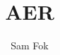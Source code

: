 \documentclass{article}
\begin{document}
\title{AER}
\author{Sam Fok}

\maketitle



% 



\end{document}
